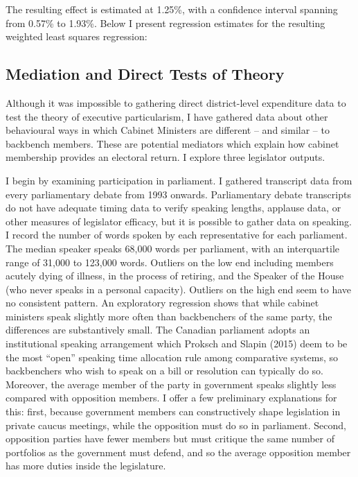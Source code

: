 \documentclass[letter,12pt]{article}
\begin{document}
The resulting effect is estimated at 1.25\%, with a confidence interval spanning from 0.57\% to 1.93\%. Below I present regression estimates for the resulting weighted least squares regression:


\pagebreak

\subsection*{Mediation and Direct Tests of Theory}

Although it was impossible to gathering direct district-level expenditure data to test the theory of executive particularism, I have gathered data about other behavioural ways in which Cabinet Ministers are different -- and similar -- to backbench members. These are potential mediators which explain how cabinet membership provides an electoral return. I explore three legislator outputs. 

I begin by examining participation in parliament. I gathered transcript data from every parliamentary debate from 1993 onwards. Parliamentary debate transcripts do not have adequate timing data to verify speaking lengths, applause data, or other measures of legislator efficacy, but it is possible to gather data on speaking. I record the number of words spoken by each representative for each parliament. The median speaker speaks 68,000 words per parliament, with an interquartile range of 31,000 to 123,000 words. Outliers on the low end including members acutely dying of illness, in the process of retiring, and the Speaker of the House (who never speaks in a personal capacity). Outliers on the high end seem to have no consistent pattern. An exploratory regression shows that while cabinet ministers speak slightly more often than backbenchers of the same party, the differences are substantively small. The Canadian parliament adopts an institutional speaking arrangement which Proksch and Slapin (2015) deem to be the most ``open'' speaking time allocation rule among comparative systems, so backbenchers who wish to speak on a bill or resolution can typically do so. Moreover, the average member of the party in government speaks slightly less compared with opposition members. I offer a few preliminary explanations for this: first, because government members can constructively shape legislation in private caucus meetings, while the opposition must do so in parliament. Second, opposition parties have fewer members but must critique the same number of portfolios as the government must defend, and so the average opposition member has more duties inside the legislature. 
\end{document}
